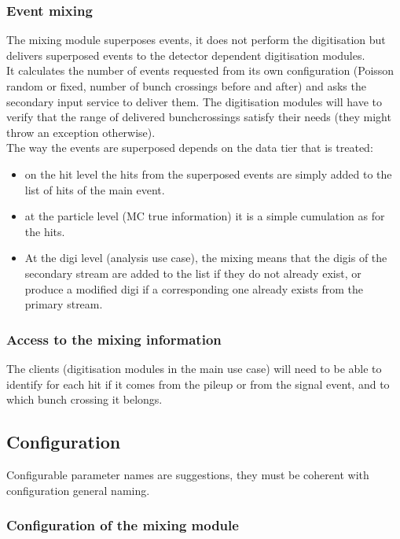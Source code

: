\documentclass[draftmode]{memarticle}
\begin{document}
\subsubsection {Event mixing}
The mixing module superposes events, it does not perform the digitisation but 
delivers superposed events to the detector dependent digitisation modules.\\
It calculates the number of events requested 
from its own configuration (Poisson random or fixed, number of bunch crossings 
before and after) and asks the secondary input service to deliver them. The 
digitisation modules will have to verify that the range of delivered 
bunchcrossings satisfy their needs (they might throw an exception otherwise). \\The way the events are superposed depends on the data tier that is treated:
\begin{itemize}
\item
on the hit level the hits from the superposed events are simply added 
to the list of hits of the main event.
\item
at the particle level (MC true information) it is a simple cumulation as for the hits.
\item
At the digi level (analysis use case), the mixing means that the digis of the 
secondary stream are added to the list if they do not already exist, or produce a modified digi if a corresponding one already exists from the primary stream.
\end{itemize}
\subsubsection{Access to the mixing information}
The clients (digitisation modules in the main use case) will need to be able to identify for each hit if it comes from the pileup or from the signal event, and to which bunch crossing it belongs.\\

\subsection {Configuration}
Configurable parameter names are suggestions, they must be coherent with 
configuration general naming.

\subsubsection {Configuration of the mixing module}
\end{document}
